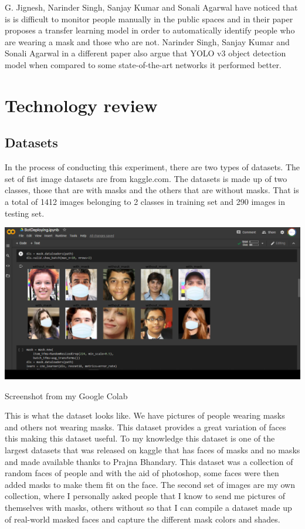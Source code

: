 G. Jignesh, Narinder Singh, Sanjay Kumar and Sonali Agarwal have noticed that is is difficult to monitor people manually in the public spaces and in their paper proposes a transfer learning model in order to automatically identify people who are wearing a mask and those who are not. \cite{chowdary2020face}
 Narinder Singh, Sanjay Kumar and Sonali Agarwal in a different paper also argue that YOLO v3 object detection model when compared to some state-of-the-art networks it performed better. \cite{punn2020monitoring}
 
 



\section{Technology review}
\subsection{Datasets}
In the process of conducting this experiment, there are two types of datasets. 
The set of fist image datasets are from kaggle.com. The datasets is made up of two classes, those that are with masks and the others that are without masks.
That is a total of 1412 images belonging to 2 classes in training set and 290 images in testing set.


    \centerline{\includegraphics[width=.5\textwidth,height=.5\textheight,keepaspectratio]{tex/images/Screenshot_Masks.png}}
     \caption{Screenshot from my Google Colab}
    \label{fig}

This is what the dataset looks like. We have pictures of people wearing masks and others not wearing masks.  This dataset provides a great variation of faces
this making this dataset useful. To my knowledge this dataset is one of the largest datasets that was released on kaggle that has faces of masks and no masks and made available thanks to Prajna Bhandary.
This dataset was a collection of random faces of people and with the aid of photoshop, some faces were then added masks to make them fit on the face. 
The second set of images are my own collection, where I personally asked people that I know to send me pictures of themselves
with masks, others without so that I can compile a dataset made up of real-world masked faces and capture the different mask colors and shades.

